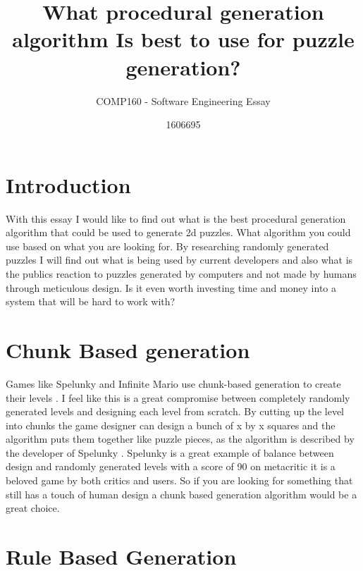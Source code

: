 \documentclass{scrartcl}
\title{What procedural generation algorithm Is best to use for puzzle generation?}
\subtitle{COMP160 - Software Engineering Essay}
\author{1606695}
\begin{document}
\maketitle


\section{Introduction}

With this essay I would like to find out what  is the best procedural generation algorithm that could be used to generate 2d puzzles. What algorithm you could use based on what you are looking for. By researching randomly generated puzzles I will find out what is being used by current developers and also what is the publics reaction to puzzles generated by computers and not made by humans through meticulous design. Is it even worth investing time and money into a system that will be hard to work with?

\section{Chunk Based generation}

Games like Spelunky and Infinite Mario use chunk-based generation to create their levels \cite{mawhorter2010procedural}. I feel like this is a great compromise between completely randomly generated levels and designing each level from scratch. By cutting up the level into chunks the game designer can design a bunch of x by x squares and the algorithm puts them together like puzzle pieces, as the algorithm is described by the developer of Spelunky \cite{spelunkygen}. Spelunky is a great example of balance between design and randomly generated levels with a score of 90 on metacritic \cite{spelunkyscore} it is a beloved game by both critics and users.  So if you are looking for something that still has a touch of human design a chunk based generation algorithm would be a great choice.

\section{Rule Based Generation}
\end{document}
